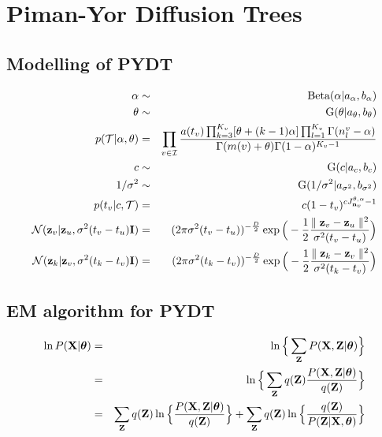 \documentclass{article}
\begin{document}
\section{Piman-Yor Diffusion Trees}
\subsection{Modelling of PYDT}	

	\begin{eqnarray}
		\alpha &\sim& \textrm{Beta}(\alpha | a_\alpha, b_\alpha) \\ 
		\theta &\sim& \textrm{G}(\theta | a_\theta, b_\theta) \\
		p(\mathcal{T}|\alpha, \theta) &=& \prod_{v \in \mathcal{I}} \frac{a(t_v) \prod^{K_v}_{k=3}[\theta + (k - 1)\alpha] \prod^{K_v}_{l=1} \Gamma(n^v_l - \alpha)}{\Gamma(m(v) + \theta) \Gamma(1 - \alpha)^{K_v - 1}} \\
		c &\sim& \textrm{G}(c | a_c, b_c) \\
		1/\sigma^2 &\sim& \textrm{G}(1/\sigma^2 | a_{\sigma^2}, b_{\sigma^2}) \\
		p(t_v | c, \mathcal{T}) &=& c(1-t_v)^{cJ^{\theta,\alpha}_{\bold{n}_v} - 1} \\
		\mathcal{N}(\bold{z}_v | \bold{z}_u, \sigma^2(t_v - t_u)\bold{I}) &=& (2 \pi \sigma^2(t_v - t_u))^{-\frac{D}{2}} \exp \Big(-\frac{1}{2}\frac{\parallel \bold{z}_v - \bold{z}_u \parallel^2}{\sigma^2 (t_v - t_u)} \Big) \\
		\mathcal{N}(\bold{z}_k | \bold{z}_v, \sigma^2(t_k - t_v)\bold{I}) &=& (2 \pi \sigma^2(t_k - t_v))^{-\frac{D}{2}} \exp \Big(-\frac{1}{2}\frac{\parallel \bold{z}_k - \bold{z}_v \parallel^2}{\sigma^2 (t_k - t_v)} \Big)
	\end{eqnarray}

	\subsection{EM algorithm for PYDT}	
	\begin{eqnarray}
		\ln P(\bold{X}|\boldsymbol{\theta}) &=& \ln \Big\{\sum_\bold{Z}P(\bold{X}, \bold{Z} | \boldsymbol{\theta}) \Big\} \nonumber \\
		&=& \ln \Big\{\sum_\bold{Z}q(\bold{Z})\frac{P(\bold{X}, \bold{Z}|\boldsymbol{\theta})}{q(\bold{Z})} \Big\} \nonumber \\
		&=& \sum_\bold{Z}q(\bold{Z})\ln \Big\{ \frac{P(\bold{X}, \bold{Z}| \boldsymbol{\theta})}{q(\bold{Z})} \Big\} + \sum_\bold{Z}q(\bold{Z})\ln \Big\{ \frac{q(\bold{Z})}{P(\bold{Z}|\bold{X}, \boldsymbol{\theta})} \Big\}
	\end{eqnarray}
\end{document}
